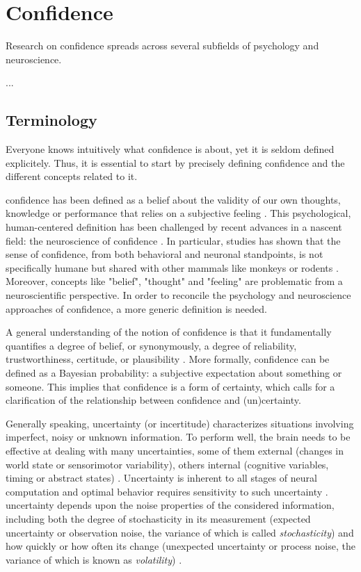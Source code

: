 \chapter{Confidence}

Research on \gls{confidence} spreads across several subfields of psychology and neuroscience.

...

\section{Terminology}

Everyone knows intuitively what \gls{confidence} is about, yet it is seldom defined explicitely. Thus, it is essential to start by precisely defining \gls{confidence} and the different concepts related to it.

\Gls{confidence} has been defined as a belief about the validity of our own thoughts, knowledge or performance that relies on a subjective feeling \cite{grimaldiThereAreThings2015}. This psychological, human-centered definition has been challenged by recent advances in a nascent field: the neuroscience of \gls{confidence} . In particular, studies  has shown that the sense of \gls{confidence}, from both behavioral and neuronal standpoints, is not specifically humane but shared with other mammals like monkeys or rodents \cite{kepecsNeuralCorrelatesComputation2008}. Moreover, concepts like "belief", "thought" and "feeling" are problematic from a neuroscientific perspective. In order to reconcile the psychology and neuroscience approaches of \gls{confidence}, a more generic definition is needed.

A general understanding of the notion of \gls{confidence} is that it fundamentally quantifies a degree of belief, or synonymously, a degree of reliability, trustworthiness, certitude, or plausibility \cite{meynielConfidenceBayesianProbability2015}. More formally, \gls{confidence} can be defined as a Bayesian probability: a subjective expectation about something or someone. This implies that \gls{confidence} is a form of certainty, which calls for a clarification of the relationship between \gls{confidence} and (un)certainty.

Generally speaking, \gls{uncertainty} (or incertitude) characterizes situations involving imperfect, noisy or unknown information. To perform well, the brain needs to be effective at dealing with many uncertainties, some of them external (changes in world state or sensorimotor variability), others internal (cognitive variables, timing or abstract states) \cite{pougetConfidenceCertaintyDistinct2016}. Uncertainty is inherent to all stages of neural computation and optimal behavior requires sensitivity to such uncertainty \cite{flemingMetacognitionConfidenceReview}. \Gls{uncertainty} depends upon the noise properties of the considered information, including both the degree of stochasticity in its measurement (expected uncertainty or observation noise, the variance of which is called \textit{stochasticity}) and how quickly or how often its change (unexpected uncertainty or process noise, the variance of which is known as \textit{volatility}) \cite{pirayModelLearningBased2021}.

